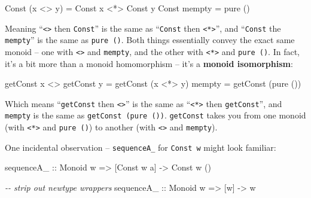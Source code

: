 \documentclass[]{article}
\newenvironment{Shaded}{}{}
\newcommand{\CommentTok}[1]{\textcolor[rgb]{0.38,0.63,0.69}{\textit{#1}}}
\newcommand{\DataTypeTok}[1]{\textcolor[rgb]{0.56,0.13,0.00}{#1}}
\newcommand{\FunctionTok}[1]{\textcolor[rgb]{0.02,0.16,0.49}{#1}}
\newcommand{\NormalTok}[1]{#1}
\newcommand{\OperatorTok}[1]{\textcolor[rgb]{0.40,0.40,0.40}{#1}}
\newcommand{\OtherTok}[1]{\textcolor[rgb]{0.00,0.44,0.13}{#1}}
\begin{document}
\begin{Shaded}
\begin{Highlighting}[]
\DataTypeTok{Const}\NormalTok{ (x }\OperatorTok{<>}\NormalTok{ y) }\OtherTok{=} \DataTypeTok{Const}\NormalTok{ x }\OperatorTok{<*>} \DataTypeTok{Const}\NormalTok{ y}
\DataTypeTok{Const} \FunctionTok{mempty}   \OtherTok{=} \FunctionTok{pure}\NormalTok{ ()}
\end{Highlighting}
\end{Shaded}

Meaning ``\texttt{\textless{}\textgreater{}} then \texttt{Const}'' is the same
as ``\texttt{Const} then \texttt{\textless{}*\textgreater{}}'', and
``\texttt{Const} the \texttt{mempty}'' is the same as \texttt{pure\ ()}. Both
things essentially convey the exact same monoid -- one with
\texttt{\textless{}\textgreater{}} and \texttt{mempty}, and the other with
\texttt{\textless{}*\textgreater{}} and \texttt{pure\ ()}. In fact, it's a bit
more than a monoid homomorphism -- it's a \textbf{monoid isomorphism}:

\begin{Shaded}
\begin{Highlighting}[]
\NormalTok{getConst x }\OperatorTok{<>}\NormalTok{ getConst y }\OtherTok{=}\NormalTok{ getConst (x }\OperatorTok{<*>}\NormalTok{ y)}
\FunctionTok{mempty}                   \OtherTok{=}\NormalTok{ getConst (}\FunctionTok{pure}\NormalTok{ ())}
\end{Highlighting}
\end{Shaded}

Which means ``\texttt{getConst} then \texttt{\textless{}\textgreater{}}'' is the
same as ``\texttt{\textless{}*\textgreater{}} then \texttt{getConst}'', and
\texttt{mempty} is the same as \texttt{getConst\ (pure\ ())}. \texttt{getConst}
takes you from one monoid (with \texttt{\textless{}*\textgreater{}} and
\texttt{pure\ ()}) to another (with \texttt{\textless{}\textgreater{}} and
\texttt{mempty}).

One incidental observation -- \texttt{sequenceA\_} for \texttt{Const\ w} might
look familiar:

\begin{Shaded}
\begin{Highlighting}[]
\OtherTok{sequenceA\_ ::} \DataTypeTok{Monoid}\NormalTok{ w }\OtherTok{=>}\NormalTok{ [}\DataTypeTok{Const}\NormalTok{ w a] }\OtherTok{{-}>} \DataTypeTok{Const}\NormalTok{ w ()}

\CommentTok{{-}{-} strip out newtype wrappers}
\OtherTok{sequenceA\_ ::} \DataTypeTok{Monoid}\NormalTok{ w }\OtherTok{=>}\NormalTok{ [w] }\OtherTok{{-}>}\NormalTok{ w}
\end{Highlighting}
\end{Shaded}
\end{document}
